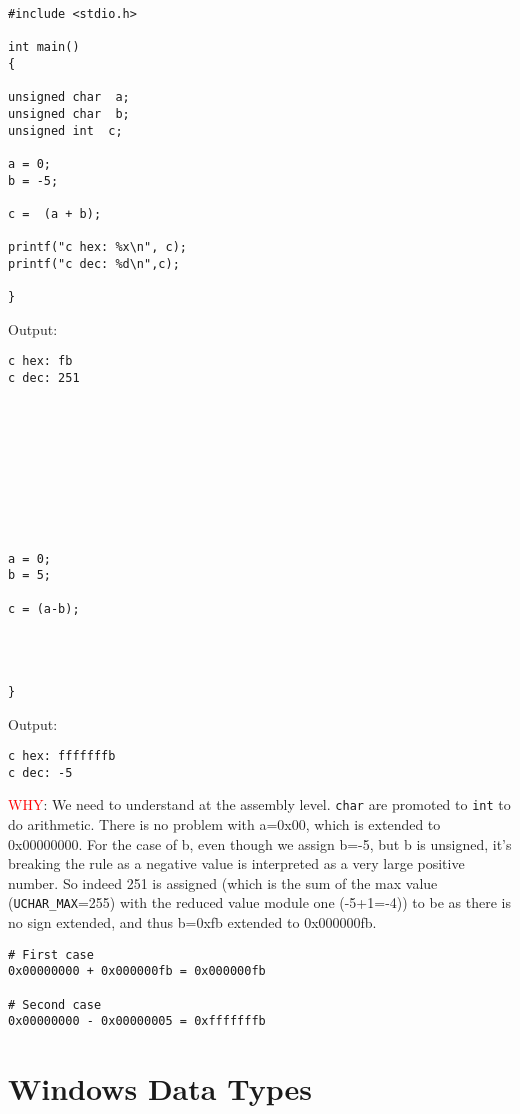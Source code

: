 \begin{minipage}[t]{0.5\textwidth}
\begin{lstlisting}
#include <stdio.h>

int main()
{

unsigned char  a;
unsigned char  b;
unsigned int  c;

a = 0;
b = -5;

c =  (a + b); 

printf("c hex: %x\n", c);
printf("c dec: %d\n",c);

}
\end{lstlisting}
Output: 
\begin{verbatim}
c hex: fb
c dec: 251
\end{verbatim}

\end{minipage}
\begin{minipage}[t]{0.5\textwidth}
\begin{lstlisting}









a = 0;
b = 5;

c = (a-b);




}
\end{lstlisting}
Output:
\begin{verbatim}
c hex: fffffffb
c dec: -5
\end{verbatim}
\end{minipage}

\textcolor{red}{WHY}: We need to understand at the assembly level. \verb!char!
are promoted to \verb!int! to do arithmetic. There is no problem with a=0x00,
which is extended to 0x00000000. For the case of b, even though we assign b=-5,
but b is unsigned, it's breaking the rule as a negative value is interpreted as
a very large positive number. So indeed 251 is assigned (which is the sum of the
max value (\verb!UCHAR_MAX!=255) with the reduced value module one (-5+1=-4)) to
be as there is no sign extended, and thus b=0xfb extended to 0x000000fb.
\begin{verbatim}
# First case
0x00000000 + 0x000000fb = 0x000000fb

# Second case
0x00000000 - 0x00000005 = 0xfffffffb
\end{verbatim}


\section{Windows Data Types}
\label{sec:WindowsDataTypes}


